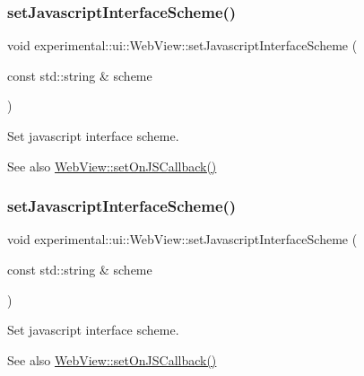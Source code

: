 \subsubsection{\texorpdfstring{set\+Javascript\+Interface\+Scheme()}{setJavascriptInterfaceScheme()}\hspace{0.1cm}{\footnotesize\ttfamily [1/2]}}
{\footnotesize\ttfamily void experimental\+::ui\+::\+Web\+View\+::set\+Javascript\+Interface\+Scheme (\begin{DoxyParamCaption}\item[{const std\+::string \&}]{scheme }\end{DoxyParamCaption})}

Set javascript interface scheme.

\begin{DoxySeeAlso}{See also}
\hyperlink{classexperimental_1_1ui_1_1WebView_a434bac1a0a15294300ada912b85c35f4}{Web\+View\+::set\+On\+J\+S\+Callback()} 
\end{DoxySeeAlso}
\mbox{\label{classexperimental_1_1ui_1_1WebView_a3beb4ee6d10fe0cc567483b65dabaa5b}} 
\subsubsection{\texorpdfstring{set\+Javascript\+Interface\+Scheme()}{setJavascriptInterfaceScheme()}\hspace{0.1cm}{\footnotesize\ttfamily [2/2]}}
{\footnotesize\ttfamily void experimental\+::ui\+::\+Web\+View\+::set\+Javascript\+Interface\+Scheme (\begin{DoxyParamCaption}\item[{const std\+::string \&}]{scheme }\end{DoxyParamCaption})}

Set javascript interface scheme.

\begin{DoxySeeAlso}{See also}
\hyperlink{classexperimental_1_1ui_1_1WebView_a434bac1a0a15294300ada912b85c35f4}{Web\+View\+::set\+On\+J\+S\+Callback()} 
\end{DoxySeeAlso}
\mbox{\label{classexperimental_1_1ui_1_1WebView_aae599457e3ff606b3b3751bcebe1df29}} 
